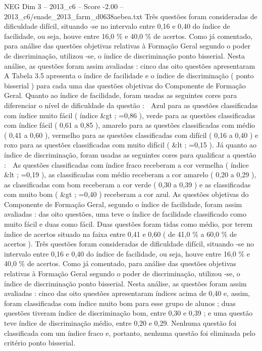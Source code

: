 \begin{textsample}{NEG Dim 3 – 2013\_c6 – Score -2.00 – 2013\_c6/enade\_2013\_farm\_d0638aebea.txt}
Três questões foram consideradas de dificuldade difícil, situando -se no intervalo entre 0,16 e 0,40 do índice de facilidade, ou seja, houve entre 16,0 \% e 40,0 \% de acertos.
Como já comentado, para análise das questões objetivas relativas à Formação Geral segundo o poder de discriminação, utilizou -se, o índice de discriminação ponto bisserial.
Nesta análise, as questões foram assim avaliadas : cinco das oito questões apresentaram A Tabela 3.5 apresenta o índice de facilidade e o índice de discriminação ( ponto bisserial ) para cada uma das questões objetivas do Componente de Formação Geral.
Quanto ao índice de facilidade, foram usadas as seguintes cores para diferenciar o nível de dificuldade da questão :  Azul para as questões classificadas com índice muito fácil ( índice \&gt ; =0,86 ), verde para as questões classificadas com índice fácil ( 0,61 a 0,85 ), amarelo para as questões classificadas com médio ( 0,41 a 0,60 ), vermelho para as questões classificadas com difícil ( 0,16 a 0,40 ) e roxo para as questões classificadas com muito difícil ( \&lt ; =0,15 ).
Já quanto ao índice de discriminação, foram usadas as seguintes cores para qualificar a questão :  As questões classificadas com índice fraco receberam a cor vermelha ( índice \&lt ; =0,19 ), as classificadas com médio receberam a cor amarelo ( 0,20 a 0,29 ), as classificadas com bom receberam a cor verde ( 0,30 a 0,39 ) e as classificadas com muito bom ( \&gt ; =0,40 ) receberam a cor azul.
As questões objetivas do Componente de Formação Geral, segundo o índice de facilidade, foram assim avaliadas : das oito questões, uma teve o índice de facilidade classificado como muito fácil e duas como fácil.
Duas questões foram tidas como médio, por terem índice de acertos situado na faixa entre 0,41 e 0,60 ( de 41,0 \% a 60,0 \% de acertos ).
Três questões foram consideradas de dificuldade difícil, situando -se no intervalo entre 0,16 e 0,40 do índice de facilidade, ou seja, houve entre 16,0 \% e 40,0 \% de acertos.
Como já comentado, para análise das questões objetivas relativas à Formação Geral segundo o poder de discriminação, utilizou -se, o índice de discriminação ponto bisserial.
Nesta análise, as questões foram assim avaliadas : cinco das oito questões apresentaram índices acima de 0,40 e, assim, foram classificadas com índice muito bom para esse grupo de alunos ; duas questões tiveram índice de discriminação bom, entre 0,30 e 0,39 ; e uma questão teve índice de discriminação médio, entre 0,20 e 0,29.
Nenhuma questão foi classificada com um índice fraco e, portanto, nenhuma questão foi eliminada pelo critério ponto bisserial.

\end{textsample}
